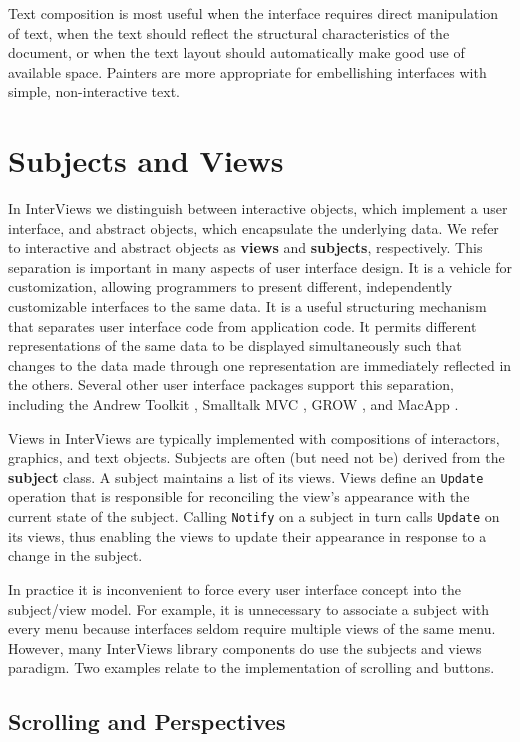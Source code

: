 Text composition is most useful when the interface requires direct
manipulation of text, when the text should reflect the structural
characteristics of the document, or when the text layout should
automatically make good use of available space.
Painters are more
appropriate for embellishing interfaces with simple, non-interactive text.

\section{Subjects and Views}

In InterViews we distinguish between interactive objects, which
implement a user interface, and abstract objects, which encapsulate the
underlying data.  We refer to interactive and abstract objects as {\bf
views} and {\bf subjects}, respectively.
This separation is important in many aspects of user
interface design.  It is a vehicle for customization, allowing
programmers to present different, independently customizable
interfaces to the same data.  It is a useful structuring
mechanism that separates user interface code from application code.
It permits different representations of the same data to be displayed
simultaneously such that changes to the data made through one
representation are immediately reflected in the others. Several other user
interface packages support this separation, including the Andrew
Toolkit \cite{atk:overview}, Smalltalk MVC \cite{st:mvc}, 
GROW \cite{grow}, and MacApp \cite{macapp}.

Views in InterViews are typically implemented with compositions of
interactors, graphics, and text objects.  Subjects are often (but need
not be) derived from the {\bf subject} class.  A subject maintains a
list of its views.  Views define an {\tt Update} operation that is
responsible for reconciling the view's appearance with the current
state of the subject.  Calling {\tt Notify} on a subject in turn calls
{\tt Update} on its views, thus enabling the views to update their
appearance in response to a change in the subject.

In practice it is
inconvenient to force every user interface concept into the
subject/view model.  For example, it is unnecessary to associate a
subject with every menu because interfaces seldom require multiple
views of the same menu.
However, many InterViews library components do use the subjects and views
paradigm.  Two examples relate to the implementation of scrolling and
buttons.

    \subsection{Scrolling and Perspectives}

